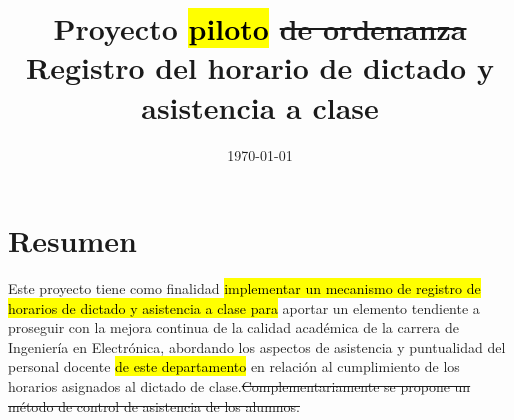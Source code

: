 \documentclass[a4paper, 11pt]{article} %
\title{\textbf{Proyecto \hl{piloto} \st{de ordenanza}}\\ %
\Large Registro del horario de dictado y asistencia a clase} %
\author{} %
\date{\today} %
\makeatletter
\renewcommand{\maketitle}{ %
\begin{flushright} %
{\LARGE\@title} %

\vspace{50pt} %


\vspace{40pt} %
\end{flushright}
}
\makeatother
\begin{document}
\maketitle %







\section*{Resumen}
Este proyecto tiene como finalidad \hl{implementar un mecanismo de registro de horarios de dictado y asistencia a clase para} aportar un elemento tendiente a proseguir con la mejora continua de la calidad académica de la carrera de Ingeniería en Electrónica, abordando los aspectos de asistencia y puntualidad del personal docente \hl{de este departamento} en relación al cumplimiento de los horarios asignados al dictado de clase.\st{Complementariamente se propone un método de control de asistencia de los alumnos. }
\end{document}
